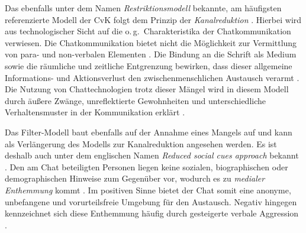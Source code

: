 \label{K2:para:kanalreduktion}
Das ebenfalls unter dem Namen \emph{Restriktionsmodell} \citep[68]{misoch_online-kommunikation_2006} bekannte, am häufigsten referenzierte Modell der CvK folgt dem Prinzip der \emph{Kanalreduktion} \citep[170]{schweiger_sozialkontakte_2019}. Hierbei wird aus technologischer Sicht auf die o.\,g.\ Charakteristika der Chatkommunikation verwiesen. Die Chatkommunikation bietet nicht die Möglichkeit zur Vermittlung von para- und non-verbalen Elementen \citep[170]{schweiger_sozialkontakte_2019}. Die Bindung an die Schrift als Medium sowie die räumliche und zeitliche Entgrenzung bewirken, dass \glqq dieser allgemeine Informations- und Aktionsverlust den zwischenmenschlichen Austausch verarmt\grqq{} \citep[426\psq]{doring_c_2013}. Die Nutzung von Chattechnologien trotz dieser Mängel wird in diesem Modell durch äußere Zwänge, unreflektierte Gewohnheiten und unterschiedliche Verhaltensmuster in der Kommunikation erklärt \citep[426\psq]{doring_c_2013}.

\label{K2:para:filter}
Das Filter-Modell baut ebenfalls auf der Annahme eines Mangels auf und kann als Verlängerung des Modells zur Kanalreduktion angesehen werden. Es ist deshalb auch unter dem englischen Namen \emph{Reduced social cues approach} bekannt \citep[427]{doring_c_2013}. Den am Chat beteiligten Personen liegen keine sozialen, biographischen oder demographischen Hinweise zum Gegenüber vor, wodurch es \glqq zu \emph{medialer Enthemmung} kommt\grqq{} \citep[171, Kursivierung im Original]{schweiger_sozialkontakte_2019}. Im positiven Sinne bietet der Chat somit eine anonyme, unbefangene und vorurteilsfreie Umgebung für den Austausch. Negativ hingegen kennzeichnet sich diese Enthemmung häufig durch gesteigerte verbale Aggression \citep[427]{doring_c_2013}.

